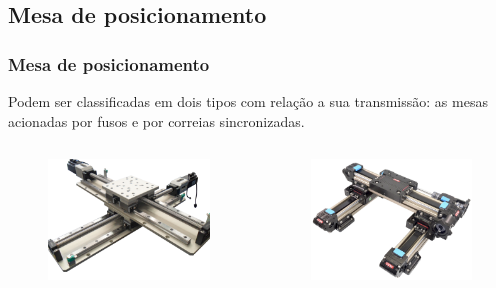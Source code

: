 \subsection{Mesa de posicionamento}

\begin{frame}
\frametitle{Mesa de posicionamento}

Podem ser classificadas em dois tipos com relação a sua transmissão: as mesas acionadas por fusos e por correias sincronizadas.

\begin{columns}
        \begin{figure}
        \centering
        \includegraphics[scale = 0.12]{figuras/mfuso}
        \end{figure}
        \begin{figure}
        \centering
        \includegraphics[scale = 0.03]{figuras/mcorreia}
        \end{figure}
\end{columns}

\end{frame}
    
